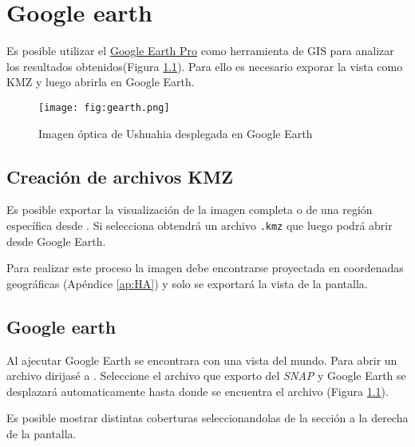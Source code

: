 \chapter{Google earth}\label{ap:GE}

Es posible utilizar el \href{https://www.google.com/earth/desktop/}{Google Earth Pro} como herramienta de GIS para analizar los resultados obtenidos(Figura \ref{fig:gearth}). Para ello es necesario exporar la vista como KMZ y luego abrirla en Google Earth.

\begin{figure}[h!]
    \centering
    \texttt{[image: fig:gearth.png]}
    \caption{Imagen óptica de Ushuahia desplegada en Google Earth}
    \label{fig:gearth}
\end{figure}

\section{Creación de archivos KMZ}

Es posible exportar la visualización de la imagen completa o de una región específica desde . Si selecciona  obtendrá un archivo \texttt{.kmz} que luego podrá abrir desde Google Earth.

Para realizar este proceso la imagen debe encontrarse proyectada en coordenadas geográficas (Apéndice \ref{ap:HA}) y solo se exportará la vista de la pantalla.

\section{Google earth}

Al ajecutar Google Earth se encontrara con una vista del mundo. Para abrir un archivo  dirijasé a . Seleccione el archivo que exporto del \emph{SNAP} y Google Earth se desplazará automaticamente hasta donde se encuentra el archivo (Figura \ref{fig:gearth}).

Es posible mostrar distintas coberturas seleccionandolas de la sección  a la derecha de la pantalla.
